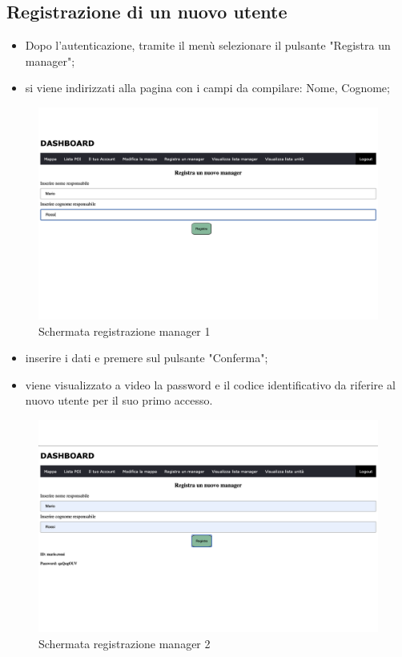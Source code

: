 \subsection{Registrazione di un nuovo utente}
\begin{itemize}
    \item Dopo l'autenticazione, tramite il menù selezionare il pulsante "Registra un manager";
    \item si viene indirizzati alla pagina con i campi da compilare: Nome, Cognome;
\end{itemize}
\begin{figure}[H]
    \centering
    \includegraphics[scale=0.12]{res/images/newmanager_admin.png}
    \caption{Schermata registrazione manager 1}
\end{figure}
\begin{itemize}
    \item inserire i dati e premere sul pulsante "Conferma";
    \item viene visualizzato a video la password e il codice identificativo da riferire al nuovo utente per il suo primo accesso.
\end{itemize}


\begin{figure}[H]
    \centering
    \includegraphics[scale=0.12]{res/images/newmanager_2.png}
    \caption{Schermata registrazione manager 2}
\end{figure}

